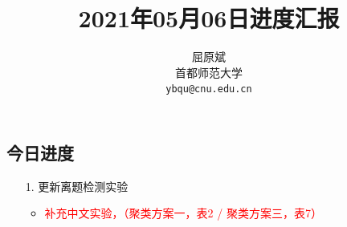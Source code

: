 \documentclass[11pt]{article}
\title{2021年05月06日进度汇报}
\author{屈原斌 \\
首都师范大学 \\
{\tt ybqu@cnu.edu.cn}}
\date{}
\begin{document}
\begin{CJK}{UTF8}{gkai}
\tableofcontents
  
\maketitle
\CJKindent


\section{今日进度}


\begin{itemize}
  \item [1.] 更新离题检测实验
  \begin{itemize}
    \item \textcolor{red}{补充中文实验，（聚类方案一，表2 / 聚类方案三，表7）}
  \end{itemize}
\end{itemize}


\end{CJK}
\end{document}
